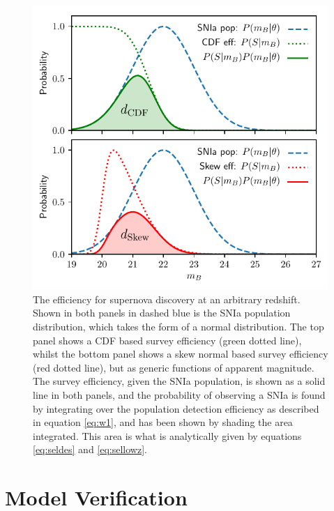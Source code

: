 \documentclass[a4paper,fleqn,usenatbib]{mnras}
\begin{document}
\begin{figure}
	\begin{center}
		\includegraphics[width=\columnwidth]{efficiency.pdf}
	\end{center}
	\caption{The efficiency for supernova discovery at an arbitrary redshift. Shown in both panels in dashed blue is the SNIa population distribution, which takes the form of a normal distribution. The top panel shows a CDF based survey efficiency (green dotted line), whilst the bottom panel shows a skew normal based survey efficiency (red dotted line), but as generic functions of apparent magnitude. The survey efficiency, given the SNIa population, is shown as a solid line in both panels, and the probability of observing a SNIa is found by integrating over the population detection efficiency as described in equation \eqref{eq:w1}, and has been shown by shading the area integrated. This area is what is analytically given by equations \eqref{eq:seldes} and \eqref{eq:sellowz}.}
	\label{fig:efficiency}
\end{figure}






\section{Model Verification}
\label{sec:verification}
\end{document}

